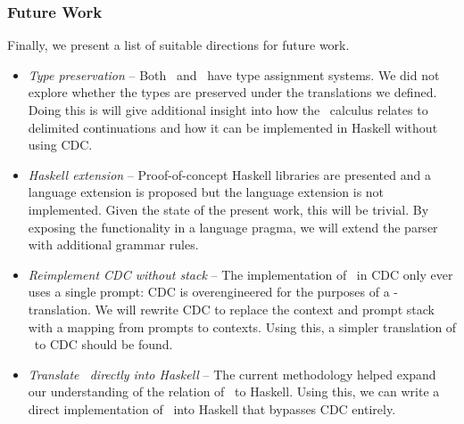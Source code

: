 \subsubsection{Future Work}
Finally, we present a list of suitable directions for future work.
\begin{itemize}
  \item \emph{Type preservation} -- Both \ltry\ and \lmu\ have type assignment systems. We did not explore whether the types are preserved under the translations we defined. Doing this is will give additional insight into how the \ltry\ calculus relates to delimited continuations and how it can be implemented in Haskell without using CDC.
  \item \emph{Haskell extension} -- Proof-of-concept Haskell libraries are presented and a language extension is proposed but the language extension is not implemented. Given the state of the present work, this will be trivial. By exposing the functionality in a language pragma, we will extend the parser with additional grammar rules.
  \item \emph{Reimplement CDC without stack} -- The implementation of \lmu\ in CDC only ever uses a single prompt: CDC is overengineered for the purposes of a \lmu-translation. We will rewrite CDC to replace the context and prompt stack with a mapping from prompts to contexts. Using this, a simpler translation of \lmu\ to CDC should be found.
  \item \emph{Translate \ltry\ directly into Haskell} -- The current methodology helped expand our understanding of the relation of \ltry\ to Haskell. Using this, we can write a direct implementation of \ltry\ into Haskell that bypasses CDC entirely.
\end{itemize}
